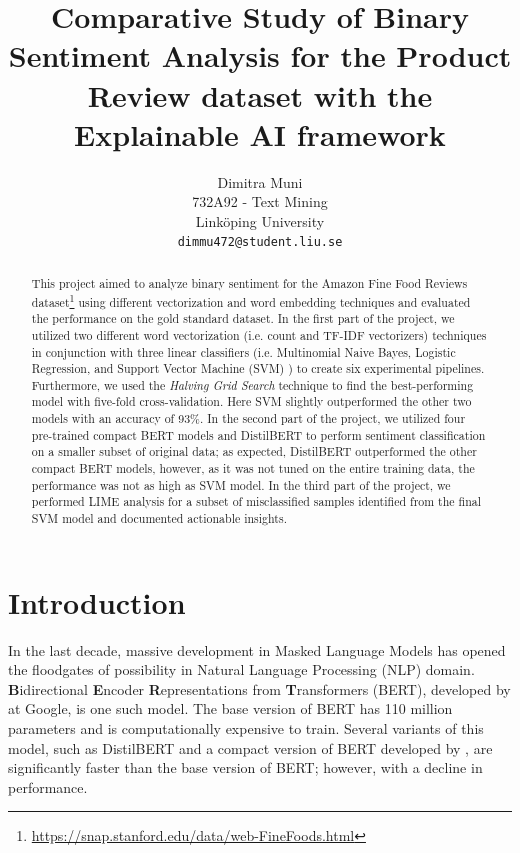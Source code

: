 \documentclass[11pt]{article}
\title{Comparative Study of Binary Sentiment Analysis for the Product Review dataset with the Explainable AI framework}
\author{Dimitra Muni\\
  732A92 - Text Mining \\
  Linköping University \\
  \texttt{dimmu472@student.liu.se}
  }
\begin{document}
\maketitle
\begin{abstract}
This project aimed to analyze binary sentiment for the Amazon Fine Food Reviews dataset\footnote{\url{https://snap.stanford.edu/data/web-FineFoods.html}} using different vectorization and word embedding techniques and evaluated the performance on the gold standard dataset. In the first part of the project, we utilized two different word vectorization (i.e. count  and TF-IDF vectorizers) techniques in conjunction with three linear classifiers (i.e. Multinomial Naive Bayes, Logistic Regression, and Support Vector Machine (SVM) ) to create six experimental pipelines. Furthermore, we used the \textit{Halving Grid Search} technique to find the best-performing model with five-fold cross-validation. Here SVM slightly outperformed the other two models with an accuracy of 93\%. In the second part of the project, we utilized four pre-trained compact BERT models and DistilBERT to perform sentiment classification on a smaller subset of original data; as expected, DistilBERT outperformed the other compact BERT models, however, as it was not tuned on the entire training data, the performance was not as high as SVM model. In the third part of the project, we performed LIME \cite{LIME} analysis for a subset of misclassified samples identified from the final SVM model and documented actionable insights.
\end{abstract}

\section{Introduction}
In the last decade, massive development in Masked Language Models has opened the floodgates of possibility in Natural Language Processing (NLP) domain. 
\textbf{B}idirectional \textbf{E}ncoder \textbf{R}epresentations from \textbf{T}ransformers (BERT), developed by \cite{BERT} at Google, is one such model. The base version of BERT has 110 million parameters and is computationally expensive to train. Several variants of this model, such as DistilBERT \cite{distilbert} and a compact version of BERT developed by \cite{smallBERT}, are significantly faster than the base version of BERT; however, with a decline in performance.
\end{document}
